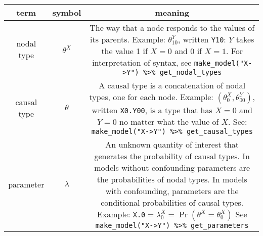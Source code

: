 \documentclass[
  12pt,
]{book}
\begin{document}
\begin{longtable}[]{@{}ccc@{}}
\toprule
\begin{minipage}[b]{0.20\columnwidth}\centering
\textbf{term}\strut
\end{minipage} & \begin{minipage}[b]{0.15\columnwidth}\centering
\textbf{symbol}\strut
\end{minipage} & \begin{minipage}[b]{0.57\columnwidth}\centering
\textbf{meaning}\strut
\end{minipage}\tabularnewline
\midrule
\endhead
\begin{minipage}[t]{0.20\columnwidth}\centering
nodal type\strut
\end{minipage} & \begin{minipage}[t]{0.15\columnwidth}\centering
\(\theta^X\)\strut
\end{minipage} & \begin{minipage}[t]{0.57\columnwidth}\centering
The way that a node responds to the values of its parents. Example: \(\theta^Y_{10}\), written \texttt{Y10}: \(Y\) takes the value 1 if \(X=0\) and 0 if \(X=1\). For interpretation of syntax, see \texttt{make\_model("X-\textgreater{}Y")\ \%\textgreater{}\%\ get\_nodal\_types}\strut
\end{minipage}\tabularnewline
\begin{minipage}[t]{0.20\columnwidth}\centering
causal type\strut
\end{minipage} & \begin{minipage}[t]{0.15\columnwidth}\centering
\(\theta\)\strut
\end{minipage} & \begin{minipage}[t]{0.57\columnwidth}\centering
A causal type is a concatenation of nodal types, one for each node. Example: \((\theta^X_0, \theta^Y_{00})\), written \texttt{X0.Y00}, is a type that has \(X=0\) and \(Y=0\) no matter what the value of \(X\). See: \texttt{make\_model("X-\textgreater{}Y")\ \%\textgreater{}\%\ get\_causal\_types}\strut
\end{minipage}\tabularnewline
\begin{minipage}[t]{0.20\columnwidth}\centering
parameter\strut
\end{minipage} & \begin{minipage}[t]{0.15\columnwidth}\centering
\(\lambda\)\strut
\end{minipage} & \begin{minipage}[t]{0.57\columnwidth}\centering
An unknown quantity of interest that generates the probability of causal types. In models without confounding parameters are the probabilities of nodal types. In models with confounding, parameters are the conditional probabilities of causal types. Example: \texttt{X.0}\(=\lambda^X_0 = \Pr(\theta^X = \theta^X_0)\) See \texttt{make\_model("X-\textgreater{}Y")\ \%\textgreater{}\%\ get\_parameters}\strut

\end{minipage}
\end{longtable}
\end{document}
